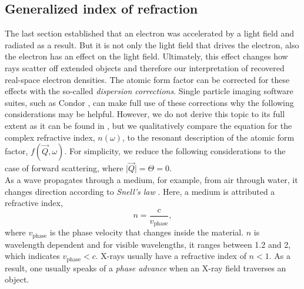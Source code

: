 \subsection{Generalized index of refraction}\label{sec:generalized-index-of-refraction}
The last section established that an electron was accelerated by a light field and radiated as a result.
But it is not only the light field that drives the electron, also the electron has an effect on the light field. Ultimately, this effect changes how rays scatter off extended objects and therefore our interpretation of recovered real-space electron densities. The atomic form factor can be corrected for these effects with the so-called \textit{dispersion corrections}. Single particle imaging software suites, such as Condor \cite{Hantke-2016-JCR}, can make full use of these corrections why the following considerations may be helpful. However, we do not derive this topic to its full extent as it can be found in \citep[][p. 55 ff]{Attwood-2007-CUP}, but we qualitatively compare the equation for the complex refractive index, $n\left(\omega\right)$, to the resonant description of the atomic form factor, $f\left(\vec{Q},\omega\right)$. For simplicity, we reduce the following considerations to the case of forward scattering, where $\lvert\vec{Q}\rvert=\Theta=0$.\\[1\baselineskip]
%
As a wave propagates through a medium, for example, from air through water, it changes direction according to \textit{Snell's law} \citep{Als-Nielson-2011-JWS}. Here, a medium is attributed a refractive index,
\begin{equation}
n=\frac{c}{v_{\text{phase}}},
\label{eq:refractive-index}
\end{equation}
where $v_{\text{phase}}$ is the phase velocity that changes inside the material. $n$ is wavelength dependent and for visible wavelengths, it ranges between 1.2 and 2, which indicates $v_{\text{phase}}<c$. X-rays usually have a refractive index of $n<1$. As a result, one usually speaks of a \textit{phase advance} when an X-ray field traverses an object.
